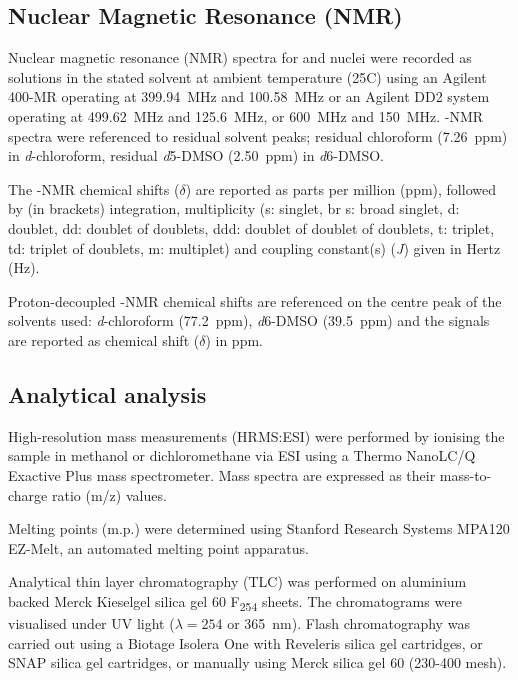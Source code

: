 \begin{refsection}
\subsection{Nuclear Magnetic Resonance (NMR)}
Nuclear magnetic resonance (NMR) spectra for  and  nuclei were recorded as solutions in the stated solvent at ambient temperature (25\degree{}C) using an Agilent 400-MR operating at 399.94~MHz and 100.58~MHz or an Agilent DD2 system operating at 499.62~MHz and 125.6~MHz, or 600~MHz and 150~MHz. 
-NMR spectra were referenced to residual solvent peaks; residual chloroform (7.26~ppm) in \textit{d}-chloroform, residual \textit{d}5-DMSO (2.50~ppm) in \textit{d}6-DMSO.\@

The -NMR chemical shifts ($\delta$) are reported as parts per million (ppm), followed
by (in brackets) integration, multiplicity (s: singlet, br s: broad singlet, d: doublet, dd: doublet of doublets, ddd: doublet of doublet of doublets, t: triplet, td: triplet of doublets, m: multiplet) and coupling constant(s) (\textit{J}) given in Hertz (Hz).

Proton-decoupled -NMR chemical shifts are referenced on the centre peak of the
solvents used: \textit{d}-chloroform (77.2~ppm), \textit{d}6-DMSO (39.5~ppm) and the signals are reported as chemical shift ($\delta$) in ppm.

\subsection{Analytical analysis}
High-resolution mass measurements (HRMS:ESI) were performed by ionising the sample in methanol or dichloromethane via ESI using a Thermo NanoLC/Q Exactive Plus mass spectrometer.
Mass spectra are expressed as their mass-to-charge ratio (m/z) values.

Melting points (m.p.) were determined using Stanford Research Systems MPA120 EZ-Melt, an automated melting point apparatus.

Analytical thin layer chromatography (TLC) was performed on aluminium backed Merck Kieselgel silica gel 60 F\textsubscript{254} sheets. 
The chromatograms were visualised under UV light ($\lambda = 254$ or 365~nm). 
Flash chromatography was carried out using a Biotage Isolera One with Reveleris silica gel cartridges, or SNAP silica gel cartridges, or manually using Merck silica gel 60 (230-400 mesh).


\end{refsection}
